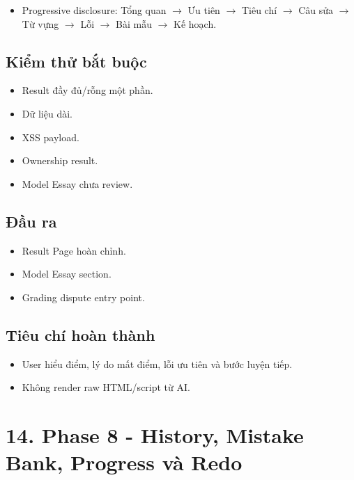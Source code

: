 \documentclass[
  11pt,
  a4paper,
]{article}
\begin{document}
\begin{itemize}
\item
  Progressive disclosure: Tổng quan \(\rightarrow\) Ưu tiên \(\rightarrow\) Tiêu chí \(\rightarrow\) Câu sửa \(\rightarrow\) Từ
  vựng \(\rightarrow\) Lỗi \(\rightarrow\) Bài mẫu \(\rightarrow\) Kế hoạch.
\end{itemize}

\subsection{Kiểm thử bắt
buộc}\label{kiux1ec3m-thux1eed-bux1eaft-buux1ed9c-5}

\begin{itemize}
\item
  Result đầy đủ/rỗng một phần.
\item
  Dữ liệu dài.
\item
  XSS payload.
\item
  Ownership result.
\item
  Model Essay chưa review.
\end{itemize}

\subsection{Đầu ra}\label{ux111ux1ea7u-ra-7}

\begin{itemize}
\item
  Result Page hoàn chỉnh.
\item
  Model Essay section.
\item
  Grading dispute entry point.
\end{itemize}

\subsection{Tiêu chí hoàn
thành}\label{tiuxeau-chuxed-houxe0n-thuxe0nh-7}

\begin{itemize}
\item
  User hiểu điểm, lý do mất điểm, lỗi ưu tiên và bước luyện tiếp.
\item
  Không render raw HTML/script từ AI.
\end{itemize}

\section{14. Phase 8 - History, Mistake Bank, Progress và
Redo}\label{phase-8---history-mistake-bank-progress-vuxe0-redo}
\end{document}
